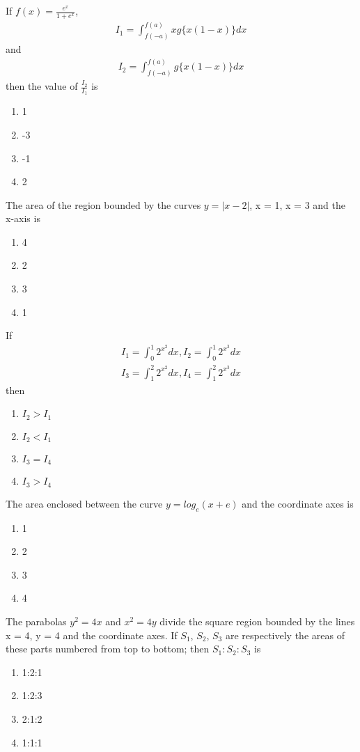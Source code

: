 \item If $f(x) = \frac{e^x}{1 + e^x}$,
\begin{align*}
I_1 = \int_{f(-a)}^{f(a)}xg\{x(1-x)\}dx
\end{align*}
and
\begin{align*}
I_2 = \int_{f(-a)}^{f(a)}g\{x(1-x)\}dx
\end{align*}
then the value of $\frac{I_2}{I_1}$ is
\begin{enumerate}
\item 1
\item -3
\item -1
\item 2
\end{enumerate}

\item The area of the region bounded by the curves $y = |x - 2|$, x = 1, x = 3 and the x-axis is
\begin{enumerate}
\item 4
\item 2
\item 3
\item 1
\end{enumerate}

\item If 
\begin{align*}
I_1 = \int_{0}^{1}2^{x^2}dx, I_2 = \int_{0}^{1}2^{x^3}dx
\end{align*}
\begin{align*}
I_3 = \int_{1}^{2}2^{x^2}dx, I_4 = \int_{1}^{2}2^{x^3}dx
\end{align*}
then
\begin{enumerate}
\item $I_2 > I_1$
\item $I_2 < I_1$
\item $I_3 = I_4$
\item $I_3 > I_4$
\end{enumerate}

\item The area enclosed between the curve $y = log_e(x + e)$ and the coordinate axes is
\begin{enumerate}
\item 1
\item 2
\item 3
\item 4
\end{enumerate}

\item The parabolas $y^2 = 4x$ and $x^2 = 4y$ divide the square region bounded by the lines x = 4, y = 4 and the coordinate axes. If $S_1$, $S_2$, $S_3$ are respectively the areas of these parts numbered from top to bottom; then 
$S_1:S_2:S_3$ is
\begin{enumerate}
\item 1:2:1
\item 1:2:3
\item 2:1:2
\item 1:1:1
\end{enumerate}

